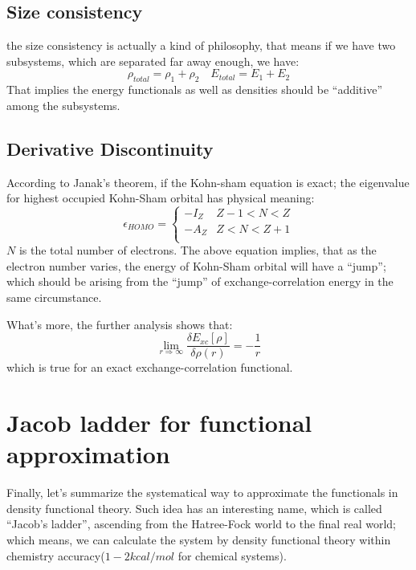 \subsection{Size consistency}
\label{sec:size_consistency}

the size consistency is actually a kind of philosophy, that means if we have
two subsystems, which are separated far away enough, we have:
\begin{equation}
 \label{eq:size_consistency}
\rho_{total} = \rho_{1} + \rho_{2} \quad  E_{total} = E_{1} + E_{2}
\end{equation}
That implies the energy functionals as well as densities should be
``additive'' among the subsystems. 



\subsection{Derivative Discontinuity}
\label{sec:derivative_discontinuity}

According to Janak's theorem\cite{PhysRevB.18.7165}, if the Kohn-sham equation
is exact; the eigenvalue for highest occupied Kohn-Sham orbital has physical
meaning:
\begin{equation}
 \epsilon_{HOMO} =
\begin{cases}
 -I_{Z} &  Z-1 < N < Z \\
 -A_{Z} &  Z < N < Z+1 \\ 
\end{cases}
\label{sec:derivative_discontinuity:1}
\end{equation}
$N$ is the total number of electrons. The above equation implies, that as the
electron number varies, the energy of Kohn-Sham orbital will have a ``jump'';
which should be arising from the ``jump'' of exchange-correlation energy in
the same circumstance. 

What's more, the further analysis shows that:
\begin{equation}
 \label{sec:derivative_discontinuity:2}
\lim_{r\Rightarrow\infty}\frac{\delta E_{xc}[\rho]}{\delta \rho(r)} =
-\frac{1}{r}
\end{equation}
which is true for an exact exchange-correlation functional.
 
\section{Jacob ladder for functional approximation}
\label{jacobi_functional_approximation}
%
%
%
Finally, let's summarize the systematical way to approximate the functionals
in density functional theory. Such idea has an interesting name, which is
called ``Jacob's ladder''\cite{jacob_ladder}, ascending from the Hatree-Fock
world to the final
real world; which means, we can calculate the system by density functional
theory within chemistry accuracy($1-2kcal/mol$ for chemical systems).

